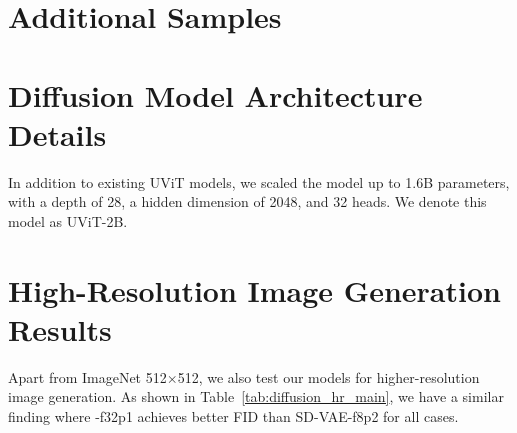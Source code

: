 \appendix

\section{Additional Samples}




\section{Diffusion Model Architecture Details}
In addition to existing UViT models, we scaled the model up to 1.6B parameters, with a depth of 28, a hidden dimension of 2048, and 32 heads. We denote this model as UViT-2B.

\section{High-Resolution Image Generation Results}


Apart from ImageNet 512$\times$512, we also test our models for higher-resolution image generation. As shown in Table~\ref{tab:diffusion_hr_main}, we have a similar finding where \modelshort-f32p1 achieves better FID than SD-VAE-f8p2 for all cases. 

